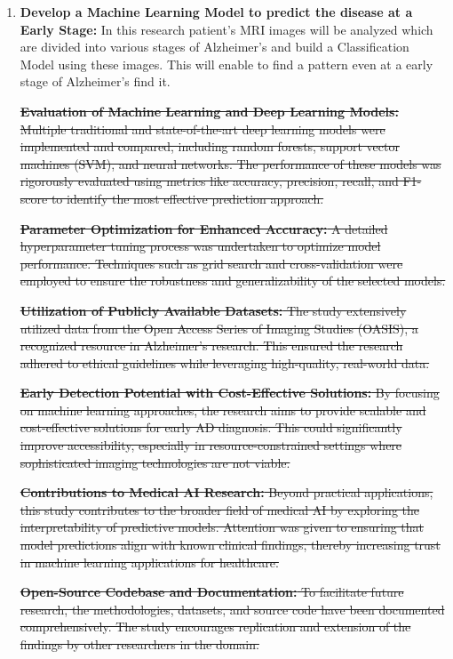 \documentclass[10pt,twocolumn]{report}
\begin{document}
\begin{enumerate}[nosep]
    \item \textbf{Develop a Machine Learning Model to predict the disease at a Early Stage:} In this research patient's MRI images will be analyzed which are divided into various stages of Alzheimer's and build a Classification Model using these images. This will enable to find a pattern even at a early stage of Alzheimer's find it.

    \sout{ \textbf{Evaluation of Machine Learning and Deep Learning Models:} Multiple traditional and state-of-the-art deep learning models were implemented and compared, including random forests, support vector machines (SVM), and neural networks. The performance of these models was rigorously evaluated using metrics like accuracy, precision, recall, and F1-score to identify the most effective prediction approach.}

    \sout{ \textbf{Parameter Optimization for Enhanced Accuracy:} A detailed hyperparameter tuning process was undertaken to optimize model performance. Techniques such as grid search and cross-validation were employed to ensure the robustness and generalizability of the selected models.}

    \sout{ \textbf{Utilization of Publicly Available Datasets:} The study extensively utilized data from the Open Access Series of Imaging Studies (OASIS), a recognized resource in Alzheimer’s research. This ensured the research adhered to ethical guidelines while leveraging high-quality, real-world data.}

    \sout{ \textbf{Early Detection Potential with Cost-Effective Solutions:} By focusing on machine learning approaches, the research aims to provide scalable and cost-effective solutions for early AD diagnosis. This could significantly improve accessibility, especially in resource-constrained settings where sophisticated imaging technologies are not viable.}

    \sout{ \textbf{Contributions to Medical AI Research:} Beyond practical applications, this study contributes to the broader field of medical AI by exploring the interpretability of predictive models. Attention was given to ensuring that model predictions align with known clinical findings, thereby increasing trust in machine learning applications for healthcare.}

    \sout{ \textbf{Open-Source Codebase and Documentation:} To facilitate future research, the methodologies, datasets, and source code have been documented comprehensively. The study encourages replication and extension of the findings by other researchers in the domain.}

\end{enumerate}
\end{document}

